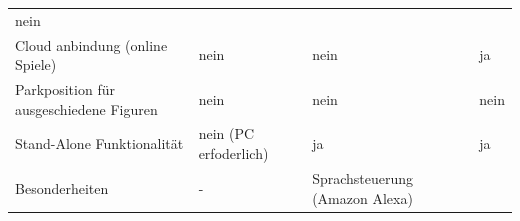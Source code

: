 \begin{longtable}[]{@{}llll@{}}
\begin{minipage}[t]{0.16\columnwidth}
nein\strut
\end{minipage}\tabularnewline
\begin{minipage}[t]{0.24\columnwidth}\raggedright
Cloud anbindung (online Spiele)\strut
\end{minipage} & \begin{minipage}[t]{0.24\columnwidth}\raggedright
nein\strut
\end{minipage} & \begin{minipage}[t]{0.25\columnwidth}\raggedright
nein\strut
\end{minipage} & \begin{minipage}[t]{0.16\columnwidth}\raggedright
ja\strut
\end{minipage}\tabularnewline
\begin{minipage}[t]{0.24\columnwidth}\raggedright
Parkposition für ausgeschiedene Figuren\strut
\end{minipage} & \begin{minipage}[t]{0.24\columnwidth}\raggedright
nein\strut
\end{minipage} & \begin{minipage}[t]{0.25\columnwidth}\raggedright
nein\strut
\end{minipage} & \begin{minipage}[t]{0.16\columnwidth}\raggedright
nein\strut
\end{minipage}\tabularnewline
\begin{minipage}[t]{0.24\columnwidth}\raggedright
Stand-Alone Funktionalität\strut
\end{minipage} & \begin{minipage}[t]{0.24\columnwidth}\raggedright
nein (PC erfoderlich)\strut
\end{minipage} & \begin{minipage}[t]{0.25\columnwidth}\raggedright
ja\strut
\end{minipage} & \begin{minipage}[t]{0.16\columnwidth}\raggedright
ja\strut
\end{minipage}\tabularnewline
\begin{minipage}[t]{0.24\columnwidth}\raggedright
Besonderheiten\strut
\end{minipage} & \begin{minipage}[t]{0.24\columnwidth}\raggedright
-\strut
\end{minipage} & \begin{minipage}[t]{0.25\columnwidth}\raggedright
Sprachsteuerung (Amazon Alexa)\strut
\end{minipage} & \begin{minipage}[t]{0.16\columnwidth}\raggedright

\end{minipage}
\end{longtable}
